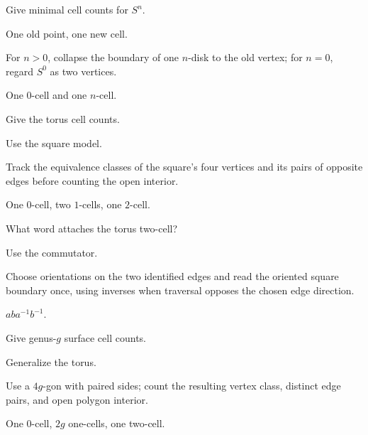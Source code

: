 \begin{exercise}\label{exr:viii05-16}
Give minimal cell counts for \(S^n\).
\end{exercise}
\begin{hint}
One old point, one new cell.

For \(n>0\), collapse the boundary of one \(n\)-disk to the old vertex; for \(n=0\), regard \(S^0\) as two vertices.
\end{hint}
\begin{solution}
One \(0\)-cell and one \(n\)-cell.
\end{solution}

\begin{exercise}\label{exr:viii05-17}
Give the torus cell counts.
\end{exercise}
\begin{hint}
Use the square model.

Track the equivalence classes of the square's four vertices and its pairs of opposite edges before counting the open interior.
\end{hint}
\begin{solution}
One \(0\)-cell, two \(1\)-cells, one \(2\)-cell.
\end{solution}

\begin{exercise}\label{exr:viii05-18}
What word attaches the torus two-cell?
\end{exercise}
\begin{hint}
Use the commutator.

Choose orientations on the two identified edges and read the oriented square boundary once, using inverses when traversal opposes the chosen edge direction.
\end{hint}
\begin{solution}
\(aba^{-1}b^{-1}\).
\end{solution}

\begin{exercise}\label{exr:viii05-19}
Give genus-\(g\) surface cell counts.
\end{exercise}
\begin{hint}
Generalize the torus.

Use a \(4g\)-gon with paired sides; count the resulting vertex class, distinct edge pairs, and open polygon interior.
\end{hint}
\begin{solution}
One \(0\)-cell, \(2g\) one-cells, one two-cell.
\end{solution}

